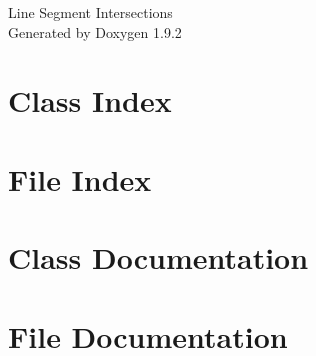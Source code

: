 \documentclass[twoside]{book}
\newcommand{\+}{\discretionary{\mbox{\scriptsize$\hookleftarrow$}}{}{}}
\newcommand{\clearemptydoublepage}{%
    \newpage{\pagestyle{empty}\cleardoublepage}%
  }
\begin{document}
  \raggedbottom
    \hypersetup{pageanchor=false,
                bookmarksnumbered=true,
                pdfencoding=unicode
               }
  \begin{titlepage}
  \vspace*{7cm}
  \begin{center}%
  {\Large Line Segment Intersections}\\
  \vspace*{1cm}
  {\large Generated by Doxygen 1.9.2}\\
  \end{center}
  \end{titlepage}
  \clearemptydoublepage
  \tableofcontents
  \clearemptydoublepage
  \hypersetup{pageanchor=true}
\chapter{Class Index}

\chapter{File Index}

\chapter{Class Documentation}




\chapter{File Documentation}













  \backmatter
  \newpage
  \clearemptydoublepage
  \printindex
\end{document}
